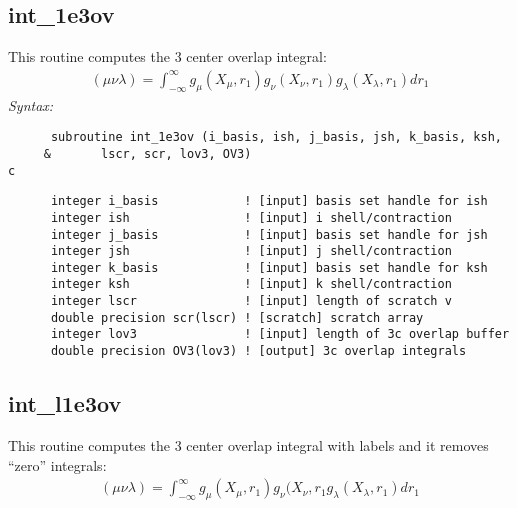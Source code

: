 \subsection{int\_1e3ov} 
This routine computes the 3 center overlap integral: 
\begin{eqnarray*} 
({\mu}{\nu}{\lambda}) = \int_{-\infty}^{\infty} g_{\mu}(X_{\mu},r_{1})g_{\nu}(X_{\nu},r_{1})g_{\lambda}(X_{\lambda},r_{1})dr
_{1} 
\end{eqnarray*} 
{\it Syntax:}  
\begin{verbatim} 
      subroutine int_1e3ov (i_basis, ish, j_basis, jsh, k_basis, ksh, 
     &       lscr, scr, lov3, OV3) 
c 
\end{verbatim} 
\begin{verbatim}  
      integer i_basis            ! [input] basis set handle for ish 
      integer ish                ! [input] i shell/contraction 
      integer j_basis            ! [input] basis set handle for jsh 
      integer jsh                ! [input] j shell/contraction 
      integer k_basis            ! [input] basis set handle for ksh 
      integer ksh                ! [input] k shell/contraction 
      integer lscr               ! [input] length of scratch v 
      double precision scr(lscr) ! [scratch] scratch array 
      integer lov3               ! [input] length of 3c overlap buffer 
      double precision OV3(lov3) ! [output] 3c overlap integrals 
\end{verbatim}  
\subsection{int\_l1e3ov} 
This routine computes the 3 center overlap integral  
with labels and it removes ``zero'' integrals: 
\begin{eqnarray*} 
({\mu}{\nu}{\lambda}) = \int_{-\infty}^{\infty} g_{\mu}(X_{\mu},r_{1})g_{\nu}(X_{\nu},r_{1}g_{\lambda}(X_{\lambda},r_{1})dr_
{1} 
\end{eqnarray*} 
 
